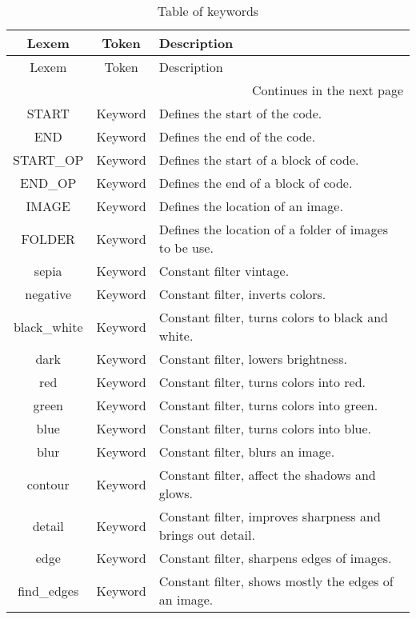 
\begin{longtable}[c]{|c|c|p{9.5cm}|}
\caption{Table of keywords}\\
\hline
    Lexem & Token & Description \\
\hline
\endfirsthead
\hline
    Lexem & Token & Description \\
\hline
\endhead %
\hline \multicolumn{3}{r}{{Continues in the next page}} \\ \hline
\endfoot %
\hline
\endlastfoot %
\hline

\hline
    START & Keyword & Defines the start of the code. \\
    END & Keyword & Defines the end of the code. \\
    START\_OP & Keyword & Defines the start of a block of code. \\
    END\_OP & Keyword & Defines the end of a block of code. \\
    IMAGE & Keyword & Defines the location of an image. \\
    FOLDER & Keyword & Defines the location of a folder of images to be use. \\
    sepia & Keyword & Constant filter vintage. \\
    negative & Keyword & Constant filter, inverts colors. \\
    black\_white & Keyword & Constant filter, turns colors to black and white. \\
    dark & Keyword & Constant filter, lowers brightness. \\
    red & Keyword & Constant filter, turns colors into red. \\
    green & Keyword & Constant filter, turns colors into green. \\
    blue & Keyword & Constant filter, turns colors into blue. \\
    blur & Keyword & Constant filter, blurs an image. \\
    contour & Keyword & Constant filter, affect the shadows and glows. \\
    detail & Keyword & Constant filter, improves sharpness and brings out detail. \\
    edge & Keyword & Constant filter, sharpens edges of images. \\
    find\_edges & Keyword & Constant filter, shows mostly the edges of an image. \\

\end{longtable}
